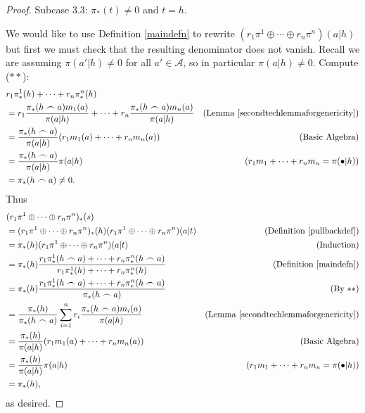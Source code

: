 \documentclass[runningheads]{llncs}
\begin{document}
\begin{proof}
    Subcase 3.3: $\pi_*(t)\not=0$ and $t=h$.

    We would like to use Definition \ref{maindefn} to rewrite
    $(r_1\pi^1\oplus\cdots\oplus r_n\pi^n)(a|h)$ but first we must
    check that the resulting denominator does not vanish.
    Recall we are assuming $\pi(a'|h)\not=0$ for all $a'\in\mathcal A$,
    so in particular $\pi(a|h)\not=0$.
    Compute ($**$):
    \begin{align*}
        &{} r_1\pi^1_*(h)+\cdots+r_n\pi^n_*(h)\\
            &= r_1\frac{\pi_*(h\frown a)m_1(a)}{\pi(a|h)}
                +\cdots+r_n\frac{\pi_*(h\frown a)m_n(a)}{\pi(a|h)}
                    &\mbox{(Lemma \ref{secondtechlemmaforgenericity})}\\
            &= \frac{\pi_*(h\frown a)}{\pi(a|h)}(r_1m_1(a)+\cdots+r_nm_n(a))
                    &\mbox{(Basic Algebra)}\\
            &= \frac{\pi_*(h\frown a)}{\pi(a|h)}\pi(a|h)
                    &\mbox{($r_1m_1+\cdots+r_nm_n=\pi(\bullet|h)$)}\\
            &= \pi_*(h\frown a)\not=0.
    \end{align*}
    Thus
    \begin{align*}
        &{} (r_1\pi^1\oplus\cdots\oplus r_n\pi^n)_*(s)\\
            &= (r_1\pi^1\oplus\cdots\oplus r_n\pi^n)_*(h)
                (r_1\pi^1\oplus\cdots\oplus r_n\pi^n)(a|t)
                    &\mbox{(Definition \ref{pullbackdef})}\\
            &= \pi_*(h)(r_1\pi^1\oplus\cdots\oplus r_n\pi^n)(a|t)
                    &\mbox{(Induction)}\\
            &= \pi_*(h)\frac{r_1\pi_*^1(h\frown a)+\cdots+r_n\pi_*^n(h\frown a)}
                {r_1\pi_*^1(h)+\cdots+r_n\pi_*^n(h)}
                    &\mbox{(Definition \ref{maindefn})}\\
            &= \pi_*(h)\frac{r_1\pi_*^1(h\frown a)+\cdots+r_n\pi_*^n(h\frown a)}
                    {\pi_*(h\frown a)}
                    &\mbox{(By $**$)}\\
            &= \frac{\pi_*(h)}{\pi_*(h\frown a)}
                \sum_{i=1}^n r_i\frac{\pi_*(h\frown a)m_i(a)}{\pi(a|h)}
                    &\mbox{(Lemma \ref{secondtechlemmaforgenericity})}\\
            &= \frac{\pi_*(h)}{\pi(a|h)}(r_1m_1(a)+\cdots+r_nm_n(a))
                    &\mbox{(Basic Algebra)}\\
            &= \frac{\pi_*(h)}{\pi(a|h)}\pi(a|h)
                    &\mbox{($r_1m_1+\cdots+r_nm_n=\pi(\bullet|h)$)}\\
            &= \pi_*(h),
    \end{align*}
    as desired.


\end{proof}
\end{document}
